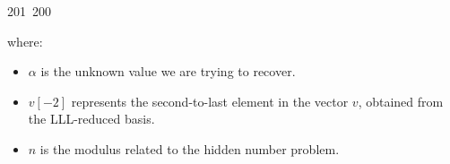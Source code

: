 201~200~\documentclass{article}
\begin{document}
\begin{enumerate}
	                                                                        	                                                                    	                                	                    	                    	                        	                        	                    	                                                                	                	                                                                    	where:
	                                                                        	                                                                    	                                	                    	                    	                        	                        	                    	                                                                	                	                                                                    	\begin{itemize}
	                                                                        	                                                                    	                                	                    	                    	                        	                        	                    	                                                                	                	                                                                    	    \item \(\alpha\) is the unknown value we are trying to recover.
	                                                                        	                                                                    	                                	                    	                    	                        	                        	                    	                                                                	                	                                                                    	        \item \(v[-2]\) represents the second-to-last element in the vector \(v\), obtained from the LLL-reduced basis.
	                                                                        	                                                                    	                                	                    	                    	                        	                        	                    	                                                                	                	                                                                    	            \item \(n\) is the modulus related to the hidden number problem.

\end{itemize}
\end{enumerate}
\end{document}
